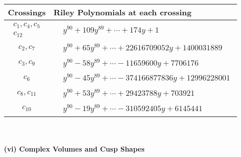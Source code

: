\documentclass[1p]{elsarticle_modified}
\theoremstyle{definition}
\begin{document}
\begin{tabular}{m{50pt}|m{274pt}}
Crossings & \hspace{64pt}Riley Polynomials at each crossing \\
\hline $$\begin{aligned}c_{1},c_{4},c_{5}\\c_{12}\end{aligned}$$&$\begin{aligned}
&y^{90}+109 y^{89}+\cdots+174 y+1
\end{aligned}$\\
\hline $$\begin{aligned}c_{2},c_{7}\end{aligned}$$&$\begin{aligned}
&y^{90}+65 y^{89}+\cdots+22616709052 y+1400031889
\end{aligned}$\\
\hline $$\begin{aligned}c_{3},c_{9}\end{aligned}$$&$\begin{aligned}
&y^{90}-58 y^{89}+\cdots-11659600 y+7706176
\end{aligned}$\\
\hline $$\begin{aligned}c_{6}\end{aligned}$$&$\begin{aligned}
&y^{90}-45 y^{89}+\cdots-374166877836 y+12996228001
\end{aligned}$\\
\hline $$\begin{aligned}c_{8},c_{11}\end{aligned}$$&$\begin{aligned}
&y^{90}+53 y^{89}+\cdots+29423788 y+703921
\end{aligned}$\\
\hline $$\begin{aligned}c_{10}\end{aligned}$$&$\begin{aligned}
&y^{90}-19 y^{89}+\cdots-310592405 y+6145441
\end{aligned}$\\
\hline
\end{tabular}\\~\\
\newpage\flushleft \textbf{(vi) Complex Volumes and Cusp Shapes}
\end{document}
